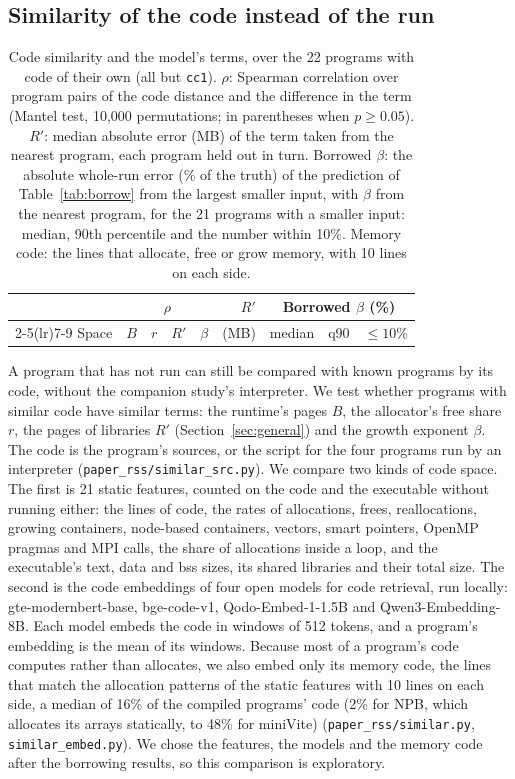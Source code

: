 \documentclass[11pt]{article}
\newcommand{\secref}[1]{Section~\ref{#1}}
\newcommand{\tabref}[1]{Table~\ref{#1}}
\begin{document}
\subsection{Similarity of the code instead of the run}

\begin{table}[!htbp]
\centering
\small
\caption{Code similarity and the model's terms, over the 22 programs with code of their own (all but \texttt{cc1}).
$\rho$: Spearman correlation over program pairs of the code distance and the difference in the term (Mantel test,
10{,}000 permutations; in parentheses when $p \ge 0.05$). $R'$: median absolute error (MB) of the term taken from the
nearest program, each program held out in turn. Borrowed $\beta$: the absolute whole-run error (\% of the truth) of
the prediction of \tabref{tab:borrow} from the largest smaller input, with $\beta$ from the nearest program, for the
21 programs with a smaller input: median, 90th percentile and the number within 10\%. Memory code: the lines that
allocate, free or grow memory, with 10 lines on each side.}
\label{tab:similar}
\setlength{\tabcolsep}{3.5pt}
\begin{tabular}{lrrrrrrrr}
\toprule
 & \multicolumn{4}{c}{$\rho$} & $R'$ & \multicolumn{3}{c}{Borrowed $\beta$ (\%)} \\
\cmidrule(lr){2-5}\cmidrule(lr){7-9}
Space & $B$ & $r$ & $R'$ & $\beta$ & (MB) & median & q90 & $\le 10\%$ \\
\midrule

\bottomrule
\end{tabular}
\end{table}

A program that has not run can still be compared with known programs by its code, without the companion study's
interpreter. We test whether programs with similar code have similar terms: the runtime's pages $B$, the allocator's
free share $r$, the pages of libraries $R'$ (\secref{sec:general}) and the growth exponent $\beta$. The code is the
program's sources, or the script for the four programs run by an interpreter (\texttt{paper\_rss/similar\_src.py}).
We compare two kinds of code space. The first is 21 static features, counted on the code and the executable without
running either: the lines of code, the rates of allocations, frees, reallocations, growing containers, node-based
containers, vectors, smart pointers, OpenMP pragmas and MPI calls, the share of allocations inside a loop, and the
executable's text, data and bss sizes, its shared libraries and their total size. The second is the code embeddings
of four open models for code retrieval, run locally: gte-modernbert-base, bge-code-v1, Qodo-Embed-1-1.5B and
Qwen3-Embedding-8B. Each model embeds the code in windows of 512 tokens, and a program's embedding is the mean of its
windows. Because most of a program's code computes rather than allocates, we also embed only its memory code, the lines
that match the allocation patterns of the static features with 10 lines on each side, a median of 16\% of the
compiled programs' code (2\% for NPB, which allocates its arrays statically, to 48\% for miniVite) (\texttt{paper\_rss/similar.py}, \texttt{similar\_embed.py}). We chose the features, the
models and the memory code after the borrowing results, so this comparison is exploratory.
\end{document}
